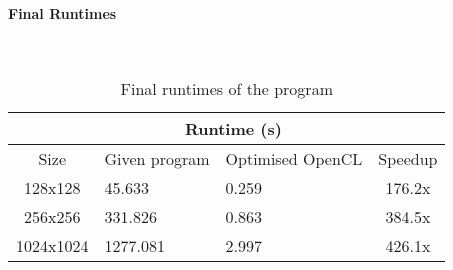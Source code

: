 
\paragraph{Final Runtimes} \textcolor{white}{.}

\begin{table}[ht]
\vspace{-6mm}
\centering
\caption{Final runtimes of the program}
\vspace{3mm}
\begin{tabular}{|c||p{4.4em}|p{4.8em}|c|}
    \hline
    & \multicolumn{2}{|c|}{Runtime (s)} &  \\
    \hline
    Size & Given program & Optimised OpenCL & Speedup\\
    \hline
    128x128 & 45.633 & 0.259 & 176.2x\\
    \hline
    256x256 & 331.826 & 0.863 & 384.5x\\
    \hline
    1024x1024 & 1277.081 & 2.997 & 426.1x\\
    \hline
\end{tabular}
\label{table:final-runtimes}
\vspace{-3mm}
\end{table}